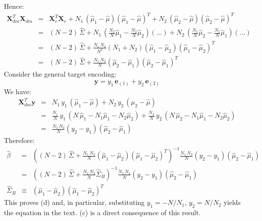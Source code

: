 Hence:
\begin{eqnarray*}
    \mathbf{X}_{dm}^T \mathbf{X}_{dm} & = & \mathbf{X}_r^T \mathbf{X}_r + 
    N_1\,(\hat{\mu}_1 - \hat{\mu}) (\hat{\mu}_1 - \hat{\mu})^T + N_2\,(\hat{\mu}_2 - \hat{\mu}) (\hat{\mu}_2 - \hat{\mu})^T  \\
    & = & (N - 2)\, \hat{\Sigma} + N_1 \, \left(\frac{N_2}{N} \hat{\mu}_1 - \frac{N_2}{N} \hat{\mu}_2\right) \left(\ldots\right) + N_2 \, \left(\frac{N_1}{N} \hat{\mu}_2 - \frac{N_1}{N} \hat{\mu}_1\right) \left(\ldots\right) \\
    & = & (N - 2)\, \hat{\Sigma} + \frac{N_1\,N_2}{N^2} (N_1 + N_2) 
        \left(\hat{\mu}_1 - \hat{\mu}_2\right)\left(\hat{\mu}_1 - \hat{\mu}_2\right)^T \\
    & = & (N - 2)\, \hat{\Sigma} + \frac{N_1\,N_2}{N} 
    \left(\hat{\mu}_2 - \hat{\mu}_1\right)\left(\hat{\mu}_2 - \hat{\mu}_1\right)^T
\end{eqnarray*}
Consider the general target encoding:
\begin{equation*}
\mathbf{y} = y_1\, \mathbf{e}_{(1)} + y_2\, \mathbf{e}_{(2)}
\end{equation*}
We have:
\begin{eqnarray*}
\mathbf{X}_{dm}^T \mathbf{y} & = & N_1\, y_1\, (\hat{\mu}_1 - \hat{\mu}) + N_2\, y_2\, (\hat{\mu}_2 - \hat{\mu}) \\
& = & \frac{N_1}{N}\, y_1\, (N\,\hat{\mu}_1 - N_1 \hat{\mu}_1  - N_2 \hat{\mu}_2) + \frac{N_2}{N}\, y_2\, (N\,\hat{\mu}_2 - N_1 \hat{\mu}_1  - N_2 \hat{\mu}_2) \\
& = & \frac{N_1 \, N_2}{N} \left(y_2 - y_1\right) \left(\hat{\mu}_2 - \hat{\mu}_1\right)
\end{eqnarray*}
Therefore:
\begin{eqnarray*}
    \hat{\beta} & = & \left((N - 2)\, \hat{\Sigma} + \frac{N_1\,N_2}{N} 
    \left(\hat{\mu}_1 - \hat{\mu}_2\right)\left(\hat{\mu}_1 - \hat{\mu}_2\right)^T\right)^{-1} \frac{N_1 \, N_2}{N} \left(y_2 - y_1\right) \left(\hat{\mu}_2 - \hat{\mu}_1\right) \\
    & = &  \left((N - 2)\, \hat{\Sigma} + \frac{N_1\,N_2}{N} 
    \hat{\Sigma}_B\right) ^{-1} \frac{N_1 \, N_2}{N} \left(y_2 - y_1\right) \left(\hat{\mu}_2 - \hat{\mu}_1\right)     \\
    \hat{\Sigma}_B & \equiv &  \left(\hat{\mu}_1 - \hat{\mu}_2\right)\left(\hat{\mu}_1 - \hat{\mu}_2\right)^T
\end{eqnarray*}
This proves (d) and, in particular, substituting $y_1 = - N / N_1$, $y_2 = N/N_2$
yields the equation in the text. (c) is a direct consequence of this result.


